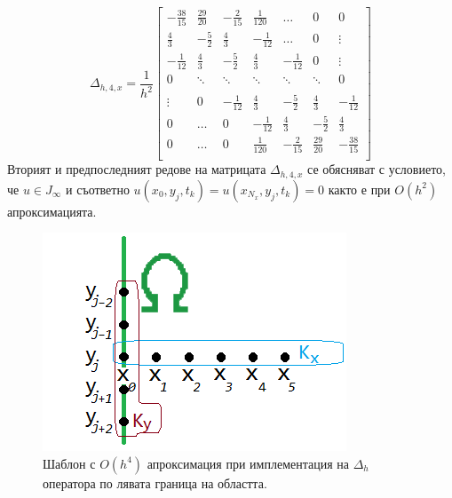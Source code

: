 \documentclass{article}
\begin{document}
\[
\Delta_{h,4,x} = \frac{1}{h^2}
\begin{bmatrix}
     -\frac{38}{15}	& \frac{29}{20}       & -\frac{2}{15}	&    \frac{1}{120}     &    \dots      	   &   0           & 0    \\
    \frac{4}{3}          &-\frac{5}{2}    	& \frac{4}{3}	&   -\frac{1}{12}	  &   \dots      	  &   0	           & \vdots  \\
    -\frac{1}{12}	& \frac{4}{3}         	& -\frac{5}{2}	&  \frac{4}{3}    	 &   -\frac{1}{12}	  &      0           &\vdots    \\
        0           		& \ddots        	&    \ddots   		 &   \ddots      	 &     \ddots      	  &  \ddots        &    0 \\	
\\
   \vdots      		 & 0           		 &  -\frac{1}{12}	& \frac{4}{3}    	& -\frac{5}{2}	&  \frac{4}{3}   &   -\frac{1}{12} \\
    0      		 &  \dots           	 &   0     		& -\frac{1}{12} 	 & \frac{4}{3} 	 & -\frac{5}{2}  &  \frac{4}{3}\\
    0              		 & \dots          	&  0              		 &\frac{1}{120} 	 &  -\frac{2}{15} 	& \frac{29}{20} & -\frac{38}{15}\\
\end{bmatrix}
\]
Вторият и предпоследният редове на матрицата $\Delta_{h,4,x}$ се обясняват с условието, че $u \in J_\infty$ и съответно $u(x_0, y_j, t_k) = u(x_{N_x}, y_j, t_k) = 0$ както е при $O(h^2)$ апроксимацията. 

\begin{figure}%
     \begin{center}
     \includegraphics[scale=.5]{LeftBoundary.png}
     \end{center}
	\caption{Шаблон с $O(h^4)$ апроксимация при имплементация на $\Delta_h$ оператора по лявата граница на областта.}
	\label{fig:LeftBoundary}
\end{figure}
\end{document}

